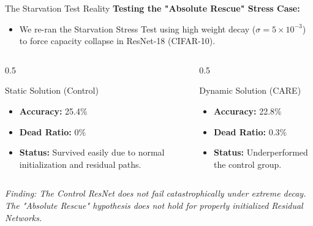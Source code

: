 \documentclass[aspectratio=169]{beamer}
\begin{document}
\begin{frame}{The Starvation Test Reality}
    \textbf{Testing the "Absolute Rescue" Stress Case:}
    \begin{itemize}
        \item We re-ran the Starvation Stress Test using high weight decay ($\sigma = 5 \times 10^{-3}$) to force capacity collapse in ResNet-18 (CIFAR-10).
    \end{itemize}
    
    \vspace{0.2cm}
    \begin{columns}
        \begin{column}{0.5\textwidth}
            \begin{block}{Static Solution (Control)}
                \begin{itemize}
                    \item \textbf{Accuracy:} 25.4\%
                    \item \textbf{Dead Ratio:} 0\%
                    \item \textbf{Status:} Survived easily due to normal initialization and residual paths.
                \end{itemize}
            \end{block}
        \end{column}
        \begin{column}{0.5\textwidth}
            \begin{block}{Dynamic Solution (CARE)}
                \begin{itemize}
                    \item \textbf{Accuracy:} 22.8\%
                    \item \textbf{Dead Ratio:} 0.3\%
                    \item \textbf{Status:} Underperformed the control group.
                \end{itemize}
            \end{block}
        \end{column}
    \end{columns}

    \vspace{0.4cm}
    \centering
    \textit{Finding: The Control ResNet does not fail catastrophically under extreme decay. The "Absolute Rescue" hypothesis does not hold for properly initialized Residual Networks.}
\end{frame}
\end{document}

